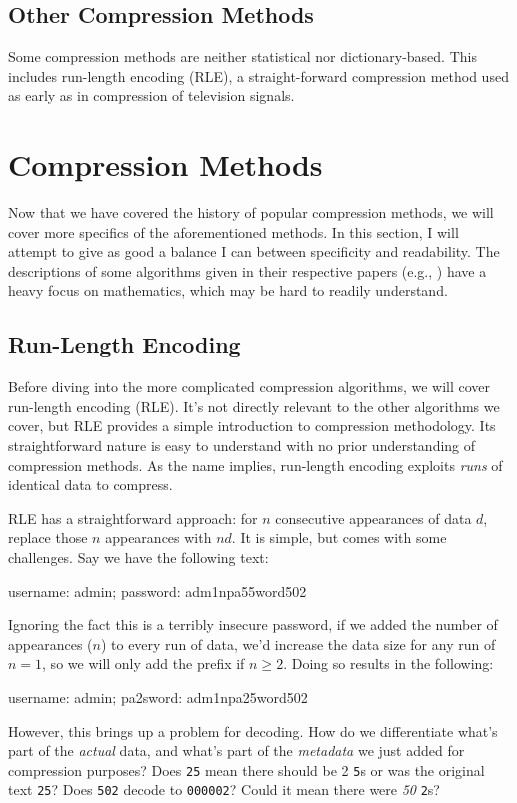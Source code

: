 \subsection{Other Compression Methods}
\label{sec:other-compressor-history}
Some compression methods are neither statistical nor dictionary-based. This
includes run-length encoding (RLE), a straight-forward compression method used
as early as \citeyear{robinson_results_1967} in compression of television
signals\cite{robinson_results_1967}.


\section{Compression Methods}
\label{sec:compression-methods}
Now that we have covered the history of popular compression methods, we will
cover more specifics of the aforementioned methods. In this section, I will
attempt to give as good a balance I can between specificity and readability. The
descriptions of some algorithms given in their respective papers (e.g.,
\cite{duda_asymmetric_2013,ziv_universal_1977,huffman_method_1952}) have a heavy
focus on mathematics, which may be hard to readily understand.

\subsection{Run-Length Encoding}
\label{sec:run-length-encoding}
Before diving into the more complicated compression algorithms, we will cover
run-length encoding (RLE). It's not directly relevant to the other algorithms we
cover, but RLE provides a simple introduction to compression methodology. Its
straightforward nature is easy to understand with no prior understanding of
compression methods. As the name implies, run-length encoding exploits
\emph{runs} of identical data to compress.

RLE has a straightforward approach: for $n$ consecutive appearances of data $d$,
replace those $n$ appearances with $nd$\cite[20]{salomon_data_2004}. It is
simple, but comes with some challenges. Say we have the following text:
\begin{cverb}
  username: admin; password: adm1npa55word502
\end{cverb}
Ignoring the fact this is a terribly insecure password, if we added the number
of appearances ($n$) to every run of data, we'd increase the data size for any
run of $n=1$, so we will only add the prefix if $n\geq2$. Doing so results in
the following:
\begin{cverb}
  username: admin; pa2sword: adm1npa25word502
\end{cverb}
However, this brings up a problem for decoding. How do we differentiate what's
part of the \emph{actual} data, and what's part of the \emph{metadata} we just
added for compression purposes? Does \texttt{25} mean there should be 2
\texttt{5}s or was the original text \texttt{25}? Does \texttt{502} decode to
\texttt{000002}? Could it mean there were \emph{50} \texttt{2}s?

